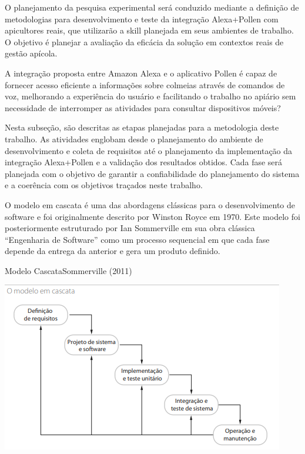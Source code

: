 O planejamento da pesquisa experimental será conduzido mediante a definição de metodologias para desenvolvimento e teste da integração Alexa+Pollen com apicultores reais, que utilizarão a skill planejada em seus ambientes de trabalho. O objetivo é planejar a avaliação da eficácia da solução em contextos reais de gestão apícola.
    
    
\label{sec:questoes-pesquisa}

A integração proposta entre Amazon Alexa e o aplicativo Pollen é capaz de fornecer acesso eficiente 
a informações sobre colmeias através de comandos de voz, melhorando a experiência do usuário 
e facilitando o trabalho no apiário sem necessidade de interromper as atividades para consultar dispositivos móveis?

\label{sec:aplicacao-metodologia}

Nesta subseção, são descritas as etapas planejadas para a metodologia deste trabalho. As atividades englobam desde o planejamento do ambiente de desenvolvimento e coleta de requisitos até o 
planejamento da implementação da integração Alexa+Pollen e a validação dos resultados obtidos. Cada fase será planejada com o objetivo de garantir a confiabilidade do planejamento do sistema e a coerência com os objetivos traçados neste trabalho.

\label{ssec:planejamento-desenvolvimento-solucao}

O modelo em cascata é uma das abordagens clássicas para o desenvolvimento de software e foi originalmente descrito por Winston Royce em 1970. 
Este modelo foi posteriormente estruturado por Ian Sommerville em sua obra clássica “Engenharia de Software” como um processo sequencial em que cada fase depende da entrega da anterior e gera um produto definido.

\begin{figura}{Modelo Cascata}{Sommerville (2011)}
    \begin{flushleft}
        \label{fig:modelo-cascata}
        \includegraphics[width=0.95\linewidth]{resources/floats/ilustracoes/cascata.png}
    \end{flushleft}
\end{figura}

